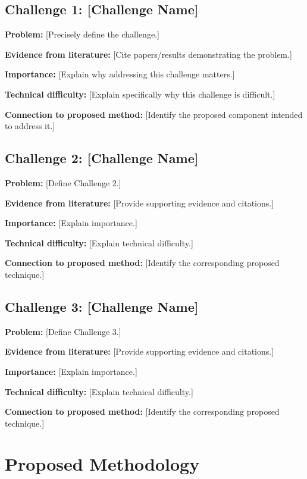 \documentclass[conference]{IEEEtran}
\begin{document}
\subsection{Challenge 1: [Challenge Name]}

\textbf{Problem:}
[Precisely define the challenge.]

\textbf{Evidence from literature:}
[Cite papers/results demonstrating the problem.]

\textbf{Importance:}
[Explain why addressing this challenge matters.]

\textbf{Technical difficulty:}
[Explain specifically why this challenge is difficult.]

\textbf{Connection to proposed method:}
[Identify the proposed component intended to address it.]


\subsection{Challenge 2: [Challenge Name]}

\textbf{Problem:}
[Define Challenge 2.]

\textbf{Evidence from literature:}
[Provide supporting evidence and citations.]

\textbf{Importance:}
[Explain importance.]

\textbf{Technical difficulty:}
[Explain technical difficulty.]

\textbf{Connection to proposed method:}
[Identify the corresponding proposed technique.]


\subsection{Challenge 3: [Challenge Name]}

\textbf{Problem:}
[Define Challenge 3.]

\textbf{Evidence from literature:}
[Provide supporting evidence and citations.]

\textbf{Importance:}
[Explain importance.]

\textbf{Technical difficulty:}
[Explain technical difficulty.]

\textbf{Connection to proposed method:}
[Identify the corresponding proposed technique.]



\section{Proposed Methodology}
\end{document}
